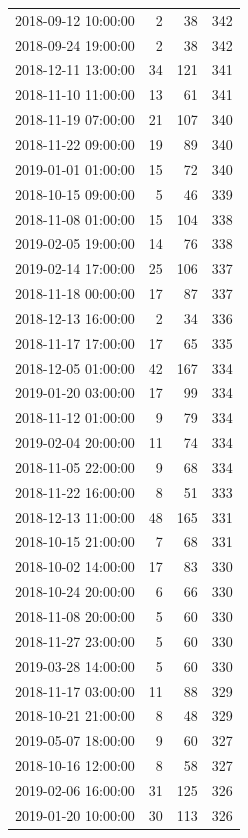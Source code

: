 \begin{tabular}{lrrr}
2018-09-12 10:00:00 & 2 & 38 & 342 \\
2018-09-24 19:00:00 & 2 & 38 & 342 \\
2018-12-11 13:00:00 & 34 & 121 & 341 \\
2018-11-10 11:00:00 & 13 & 61 & 341 \\
2018-11-19 07:00:00 & 21 & 107 & 340 \\
2018-11-22 09:00:00 & 19 & 89 & 340 \\
2019-01-01 01:00:00 & 15 & 72 & 340 \\
2018-10-15 09:00:00 & 5 & 46 & 339 \\
2018-11-08 01:00:00 & 15 & 104 & 338 \\
2019-02-05 19:00:00 & 14 & 76 & 338 \\
2019-02-14 17:00:00 & 25 & 106 & 337 \\
2018-11-18 00:00:00 & 17 & 87 & 337 \\
2018-12-13 16:00:00 & 2 & 34 & 336 \\
2018-11-17 17:00:00 & 17 & 65 & 335 \\
2018-12-05 01:00:00 & 42 & 167 & 334 \\
2019-01-20 03:00:00 & 17 & 99 & 334 \\
2018-11-12 01:00:00 & 9 & 79 & 334 \\
2019-02-04 20:00:00 & 11 & 74 & 334 \\
2018-11-05 22:00:00 & 9 & 68 & 334 \\
2018-11-22 16:00:00 & 8 & 51 & 333 \\
2018-12-13 11:00:00 & 48 & 165 & 331 \\
2018-10-15 21:00:00 & 7 & 68 & 331 \\
2018-10-02 14:00:00 & 17 & 83 & 330 \\
2018-10-24 20:00:00 & 6 & 66 & 330 \\
2018-11-08 20:00:00 & 5 & 60 & 330 \\
2018-11-27 23:00:00 & 5 & 60 & 330 \\
2019-03-28 14:00:00 & 5 & 60 & 330 \\
2018-11-17 03:00:00 & 11 & 88 & 329 \\
2018-10-21 21:00:00 & 8 & 48 & 329 \\
2019-05-07 18:00:00 & 9 & 60 & 327 \\
2018-10-16 12:00:00 & 8 & 58 & 327 \\
2019-02-06 16:00:00 & 31 & 125 & 326 \\
2019-01-20 10:00:00 & 30 & 113 & 326 \\

\end{tabular}
